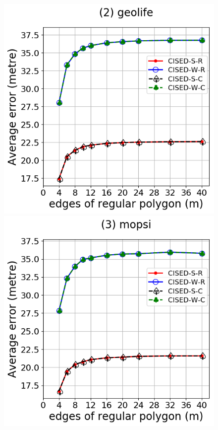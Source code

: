 {\begin{figure}[tb!]
	\includegraphics[scale = 0.2900]{Figures/Exp-M-e-60-error-geolife.png}\hspace{1ex}
	\includegraphics[scale = 0.2900]{Figures/Exp-M-e-60-error-mopsi.png}\hspace{1ex}

\end{figure}}
